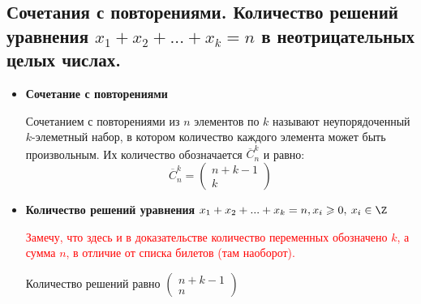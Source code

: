\subsection{Сочетания с повторениями. Количество решений уравнения $x_1 + x_2 + . . . + x_k = n$ в неотрицательных целых числах.}
\begin{itemize}
	\item \textbf{Сочетание с повторениями}
	
	Сочетанием с повторениями из $n$ элементов по $k$ называют неупорядоченный $k$-элеметный набор, в котором количество каждого элемента может быть произвольным. Их количество обозначается $\overline C^k_n$ и равно:
	$$\overline C^k_n = \begin{pmatrix}n+k-1\\k\end{pmatrix}$$
	
	\item \textbf{Количество решений уравнения $x_1 + x_2 + ... + x_k = n, x_i \geqslant 0, \: x_i \in \Z$}
	
	\textcolor{red}{Замечу, что здесь и в доказательстве количество переменных обозначено $k$, а сумма $n$, в отличие от списка билетов (там наоборот).} 
	
	Количество решений равно $\displaystyle \begin{pmatrix}n+k-1\\n\end{pmatrix}$
\end{itemize}